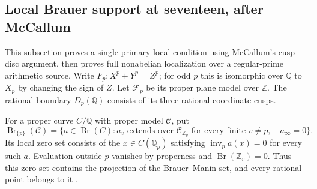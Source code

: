 \subsection{Local Brauer support at seventeen, after McCallum}
\label{subsec:seventeen-local-brauer}

This subsection proves a single-primary local condition using
McCallum's cusp-disc argument, then proves full nonabelian localization
over a regular-prime arithmetic source.  Write $F_p:X^p+Y^p=Z^p$; for odd $p$ this is isomorphic over
$\mathbb Q$ to $X_p$ by changing the sign of $Z$.  Let $\mathcal F_p$
be its proper plane model over $\mathbb Z$. The rational boundary
$D_p(\mathbb Q)$ consists of its three rational coordinate cusps.

For a proper curve $C/\mathbb Q$ with proper model $\mathcal C$, put
\[
 \operatorname{Br}_{\{p\}}(\mathcal C)
 =\{a\in\operatorname{Br}(C):
 a_v\text{ extends over }\mathcal C_{\mathbb Z_v}
 \text{ for every finite }v\ne p,\quad a_\infty=0\}.
\]
Its local zero set consists of the $x\in C(\mathbb Q_p)$ satisfying
$\operatorname{inv}_p a(x)=0$ for every such $a$.  Evaluation outside
$p$ vanishes by properness and $\operatorname{Br}(\mathbb Z_v)=0$.
Thus this zero set contains the projection of the Brauer--Manin set,
and every rational point belongs to it
\citep[\S1, pp.~393--394]{McCallum2001Brauer}.

